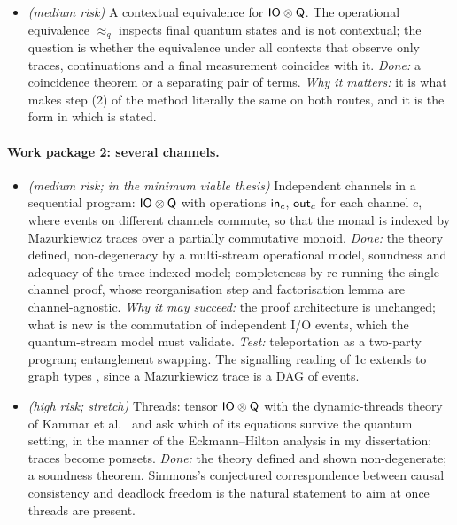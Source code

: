 \begin{itemize}[nosep]
\item[1d] \textit{(medium risk)} A contextual equivalence for $\mathsf{IO}\otimes\mathsf{Q}$. The operational equivalence $\approx_q$ inspects final quantum states and is not contextual; the question is whether the equivalence under all contexts that observe only traces, continuations and a final measurement coincides with it. \emph{Done:} a coincidence theorem or a separating pair of terms. \emph{Why it matters:} it is what makes step (2) of the method literally the same on both routes, and it is the form in which  is stated.
\end{itemize}

\paragraph{Work package 2: several channels.}
\begin{itemize}[nosep]
\item[2a] \textit{(medium risk; in the minimum viable thesis)} Independent channels in a sequential program: $\mathsf{IO}\otimes\mathsf{Q}$ with operations $\mathsf{in}_c$, $\mathsf{out}_c$ for each channel $c$, where events on different channels commute, so that the monad is indexed by Mazurkiewicz traces \cite{diekert1995traces} over a partially commutative monoid. \emph{Done:} the theory defined, non-degeneracy by a multi-stream operational model, soundness and adequacy of the trace-indexed model; completeness by re-running the single-channel proof, whose reorganisation step and factorisation lemma are channel-agnostic. \emph{Why it may succeed:} the proof architecture is unchanged; what is new is the commutation of independent I/O events, which the quantum-stream model must validate. \emph{Test:} teleportation as a two-party program; entanglement swapping. The signalling reading of 1c extends to graph types \cite{simmons2024thesis}, since a Mazurkiewicz trace is a DAG of events.
\item[2b] \textit{(high risk; stretch)} Threads: tensor $\mathsf{IO}\otimes\mathsf{Q}$ with the dynamic-threads theory of Kammar et al.\ \cite{kammar2026threads} and ask which of its equations survive the quantum setting, in the manner of the Eckmann--Hilton analysis in my dissertation; traces become pomsets. \emph{Done:} the theory defined and shown non-degenerate; a soundness theorem. Simmons's conjectured correspondence between causal consistency and deadlock freedom \cite{simmons2024thesis} is the natural statement to aim at once threads are present.
\end{itemize}


